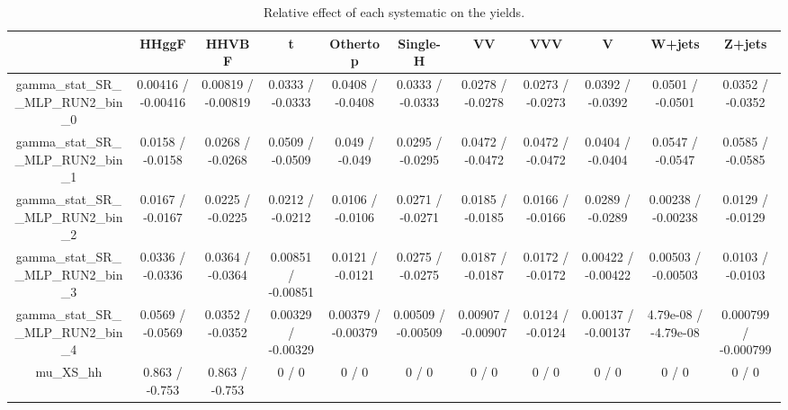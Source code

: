 \documentclass[10pt]{article}
\begin{document}
\begin{table}[htbp]
\begin{center}
\begin{tabular}{|c|c|c|c|c|c|c|c|c|c|c|}
\hline 
      & HHggF      & HHVBF      & t      & Othertop      & Single-H      & VV      & VVV      & V      & W+jets      & Z+jets \\ 
\hline 
  gamma_stat_SR__MLP_RUN2_bin_0 & 0.00416 / -0.00416 & 0.00819 / -0.00819 & 0.0333 / -0.0333 & 0.0408 / -0.0408 & 0.0333 / -0.0333 & 0.0278 / -0.0278 & 0.0273 / -0.0273 & 0.0392 / -0.0392 & 0.0501 / -0.0501 & 0.0352 / -0.0352 \\ 
  gamma_stat_SR__MLP_RUN2_bin_1 & 0.0158 / -0.0158 & 0.0268 / -0.0268 & 0.0509 / -0.0509 & 0.049 / -0.049 & 0.0295 / -0.0295 & 0.0472 / -0.0472 & 0.0472 / -0.0472 & 0.0404 / -0.0404 & 0.0547 / -0.0547 & 0.0585 / -0.0585 \\ 
  gamma_stat_SR__MLP_RUN2_bin_2 & 0.0167 / -0.0167 & 0.0225 / -0.0225 & 0.0212 / -0.0212 & 0.0106 / -0.0106 & 0.0271 / -0.0271 & 0.0185 / -0.0185 & 0.0166 / -0.0166 & 0.0289 / -0.0289 & 0.00238 / -0.00238 & 0.0129 / -0.0129 \\ 
  gamma_stat_SR__MLP_RUN2_bin_3 & 0.0336 / -0.0336 & 0.0364 / -0.0364 & 0.00851 / -0.00851 & 0.0121 / -0.0121 & 0.0275 / -0.0275 & 0.0187 / -0.0187 & 0.0172 / -0.0172 & 0.00422 / -0.00422 & 0.00503 / -0.00503 & 0.0103 / -0.0103 \\ 
  gamma_stat_SR__MLP_RUN2_bin_4 & 0.0569 / -0.0569 & 0.0352 / -0.0352 & 0.00329 / -0.00329 & 0.00379 / -0.00379 & 0.00509 / -0.00509 & 0.00907 / -0.00907 & 0.0124 / -0.0124 & 0.00137 / -0.00137 & 4.79e-08 / -4.79e-08 & 0.000799 / -0.000799 \\ 
  mu_XS_hh & 0.863 / -0.753 & 0.863 / -0.753 & 0 / 0 & 0 / 0 & 0 / 0 & 0 / 0 & 0 / 0 & 0 / 0 & 0 / 0 & 0 / 0 \\ 
\hline 
\end{tabular} 
\caption{Relative effect of each systematic on the yields.} 
\end{center} 
\end{table} 
\end{document}
